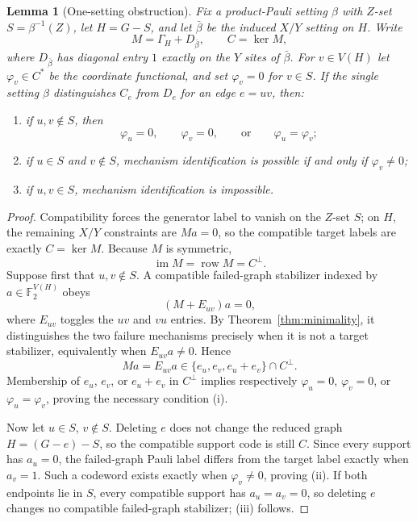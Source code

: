 \documentclass[11pt]{article}
\newtheorem{lemma}[theorem]{Lemma}
\theoremstyle{remark}
\newcommand{\F}{\mathbb{F}}
\begin{document}
\begin{lemma}[One-setting obstruction]\label{lem:repairprofile}
Fix a product-Pauli setting $\beta$ with $Z$-set $S=\beta^{-1}(Z)$, let $H=G-S$, and let $\bar\beta$ be the induced $X/Y$ setting on $H$. Write
\[
M=\Gamma_H+D_{\bar\beta},\qquad C=\ker M,
\]
where $D_{\bar\beta}$ has diagonal entry $1$ exactly on the $Y$ sites of $\bar\beta$. For $v\in V(H)$ let $\varphi_v\in C^*$ be the coordinate functional, and set $\varphi_v=0$ for $v\in S$.
If the single setting $\beta$ distinguishes $C_e$ from $D_e$ for an edge $e=uv$, then:
\begin{enumerate}[label=(\roman*)]
\item if $u,v\notin S$, then
\[
\varphi_u=0,\qquad \varphi_v=0,\qquad\text{or}\qquad \varphi_u=\varphi_v;
\]
\item if $u\in S$ and $v\notin S$, mechanism identification is possible if and only if $\varphi_v\neq0$;
\item if $u,v\in S$, mechanism identification is impossible.
\end{enumerate}
\end{lemma}
\begin{proof}
Compatibility forces the generator label to vanish on the $Z$-set $S$; on $H$, the remaining $X/Y$ constraints are $Ma=0$, so the compatible target labels are exactly $C=\ker M$. Because $M$ is symmetric,
\[
\operatorname{im}M=\operatorname{row}M=C^\perp.
\]
Suppose first that $u,v\notin S$. A compatible failed-graph stabilizer indexed by $a\in\F_2^{V(H)}$ obeys
\[
(M+E_{uv})a=0,
\]
where $E_{uv}$ toggles the $uv$ and $vu$ entries. By Theorem~\ref{thm:minimality}, it distinguishes the two failure mechanisms precisely when it is not a target stabilizer, equivalently when $E_{uv}a\neq0$. Hence
\[
Ma=E_{uv}a\in\{e_u,e_v,e_u+e_v\}\cap C^\perp.
\]
Membership of $e_u$, $e_v$, or $e_u+e_v$ in $C^\perp$ implies respectively $\varphi_u=0$, $\varphi_v=0$, or $\varphi_u=\varphi_v$, proving the necessary condition (i).

Now let $u\in S$, $v\notin S$. Deleting $e$ does not change the reduced graph $H=(G-e)-S$, so the compatible support code is still $C$. Since every support has $a_u=0$, the failed-graph Pauli label differs from the target label exactly when $a_v=1$. Such a codeword exists exactly when $\varphi_v\neq0$, proving (ii). If both endpoints lie in $S$, every compatible support has $a_u=a_v=0$, so deleting $e$ changes no compatible failed-graph stabilizer; (iii) follows.
\end{proof}
\end{document}
